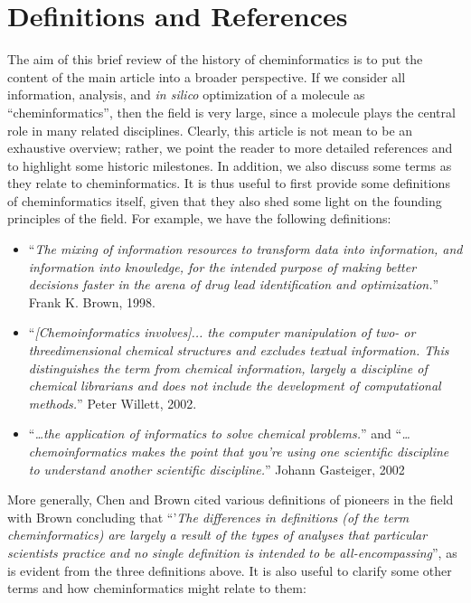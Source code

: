 \documentclass{sig-alternate}
\begin{document}
\section{Definitions and References}
The aim of this brief review of the history of cheminformatics is to
put the content of the main article into a broader perspective. If we
consider all information, analysis, and \emph{in silico} optimization
of a molecule as ``cheminformatics'', then the field is very large,
since a molecule plays the central role in many related
disciplines. Clearly, this article is not mean to be an exhaustive
overview; rather, we point the reader to more detailed references and
to highlight some historic milestones.  In addition, we also discuss
some terms as they relate to cheminformatics.  It is thus useful to
first provide some definitions of cheminformatics itself, given that
they also shed some light on the founding principles of the field. For
example, we have the following definitions:
\begin{itemize}
\item ``\textit{The mixing of information resources to transform data
    into information, and information into knowledge, for the intended
    purpose of making better decisions faster in the arena of drug
    lead identification and optimization.}'' Frank K. Brown, 1998.
\item ``\textit{[Chemoinformatics involves]... the computer
    manipulation of two- or threedimensional chemical structures and
    excludes textual information. This distinguishes the term from
    chemical information, largely a discipline of chemical librarians
    and does not include the development of computational methods.}''
  Peter Willett, 2002.
\item ``\textit{\ldots the application of informatics to solve chemical
    problems.}'' and ``\textit{\ldots chemoinformatics makes the point that
    you're using one scientific discipline to understand another
    scientific discipline.}'' Johann Gasteiger, 2002
\end{itemize}
More generally, Chen\cite{Chen2006} and Brown \cite{brown2009} cited various
definitions of pioneers in the field with Brown concluding that
``'\textit{The differences in definitions (of the term
  cheminformatics) are largely a result of the types of analyses that
  particular scientists practice and no single definition is intended
  to be all-encompassing}'', as is evident from the three definitions above. 
It is also useful to clarify some other terms and how
cheminformatics might relate to them:
\end{document}

